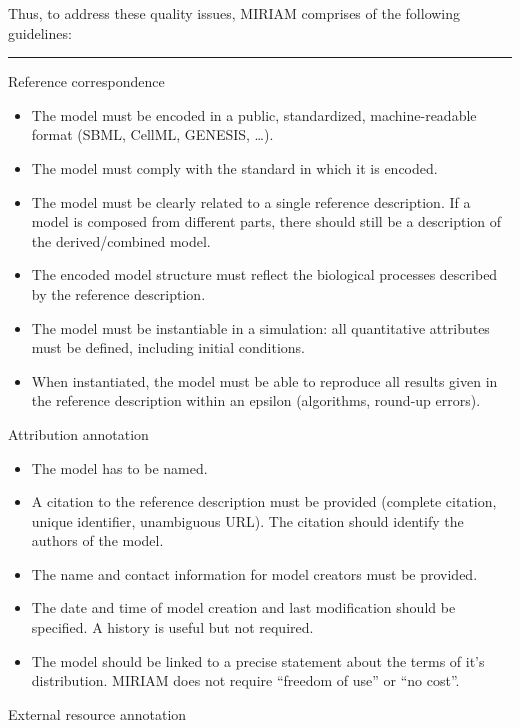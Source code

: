 Thus, to address these quality issues, MIRIAM comprises of the following
guidelines:

\begin{center}\rule{3in}{0.4pt}\end{center}

Reference correspondence

\begin{itemize}
\item
  The model must be encoded in a public, standardized, machine-readable
  format (SBML, CellML, GENESIS, \ldots{}).
\item
  The model must comply with the standard in which it is encoded.
\item
  The model must be clearly related to a single reference description.
  If a model is composed from different parts, there should still be a
  description of the derived/combined model.
\item
  The encoded model structure must reflect the biological processes
  described by the reference description.
\item
  The model must be instantiable in a simulation: all quantitative
  attributes must be defined, including initial conditions.
\item
  When instantiated, the model must be able to reproduce all results
  given in the reference description within an epsilon (algorithms,
  round-up errors).
\end{itemize}
Attribution annotation

\begin{itemize}
\item
  The model has to be named.
\item
  A citation to the reference description must be provided (complete
  citation, unique identifier, unambiguous URL). The citation should
  identify the authors of the model.
\item
  The name and contact information for model creators must be provided.
\item
  The date and time of model creation and last modification should be
  specified. A history is useful but not required.
\item
  The model should be linked to a precise statement about the terms of
  it's distribution. MIRIAM does not require ``freedom of use'' or ``no
  cost''.
\end{itemize}
External resource annotation

